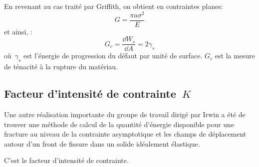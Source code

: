 \medskip
En revenant au cas traité par Griffith, on obtient en contraintes planes:
\begin{equation} G = \dfrac{\pi a\sigma^2}{E} \end{equation}
et ainsi, :
\begin{equation} G_c = \dfrac{\dd W_s}{\dd A}=2\gamma_s \end{equation}
où~$\gamma_s$ est l'énergie de progression du défaut par unité de surface.
$G_c$ est la mesure de ténacité à la rupture du matériau.


\medskip\ifVersionDuDocEstVincent\else\newpage\fi
\subsection{Facteur d'intensité de contrainte~$K$}

\medskip
\begin{histoire}%
Une autre réalisation importante du groupe de travail dirigé par Irwin a été de trouver une méthode de calcul de la quantité d'énergie disponible pour une fracture au niveau de la contrainte asymptotique et les champs de déplacement autour d'un front de fissure dans un solide idéalement élastique.

C'est le facteur d'intensité de contrainte.
\end{histoire}

